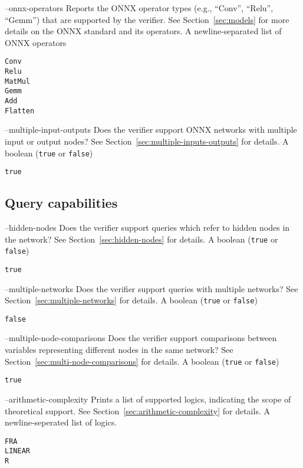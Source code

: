 \clOutputOption
{--onnx-operators}
{Reports the ONNX operator types (e.g., ``Conv'', ``Relu'', ``Gemm'') that are supported by the verifier. See Section~\ref{sec:models} for more details on the ONNX standard and its operators.
}
{A newline-separated list of ONNX operators}
\begin{lstlisting}[style=bash]
%*\exampleVerifier* supports --onnx-operators
Conv
Relu
MatMul
Gemm
Add
Flatten
\end{lstlisting}

\clOutputOption
{--multiple-input-outputs}
{Does the verifier support ONNX networks with multiple input or output nodes? See Section~\ref{sec:multiple-inputs-outputs} for details.}
{A boolean (\texttt{true} or \texttt{false})}
\begin{lstlisting}[style=bash]
%*\exampleVerifier* supports --multiple-inputs-outputs
true
\end{lstlisting}

\subsection{Query capabilities}

\clOutputOption
{--hidden-nodes}
{Does the verifier support queries which refer to hidden nodes in the network? See Section~\ref{sec:hidden-nodes} for details.}
{A boolean (\texttt{true} or \texttt{false})}
\begin{lstlisting}[style=bash]
%*\exampleVerifier* supports --hidden-nodes
true
\end{lstlisting}

\clOutputOption
{--multiple-networks}
{Does the verifier support queries with multiple networks? See Section~\ref{sec:multiple-networks} for details.}
{A boolean (\texttt{true} or \texttt{false})}
\begin{lstlisting}[style=bash]
%*\exampleVerifier* supports --multiple-networks
false
\end{lstlisting}

\clOutputOption
{--multiple-node-comparisons}
{Does the verifier support comparisons between variables representing different nodes in the same network? See Section~\ref{sec:multi-node-comparisons} for details.}
{A boolean (\texttt{true} or \texttt{false})}
\begin{lstlisting}[style=bash]
%*\exampleVerifier* supports --multiple-node-comparisons
true
\end{lstlisting}

\clOutputOption
{--arithmetic-complexity}
{Prints a list of supported \vnnlib{} logics, indicating the scope of theoretical support. See Section~\ref{sec:arithmetic-complexity} for details.
}
{A newline-seperated list of logics.}
\begin{lstlisting}[style=bash]
%*\exampleVerifier* supports --logics
FRA
LINEAR
R
\end{lstlisting}



